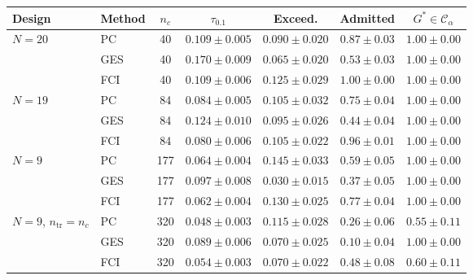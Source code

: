 \begin{tabular}{llccccc}
\toprule
Design & Method & $n_c$ & $\tau_{0.1}$ & Exceed. & Admitted & $G^\ast\in\mathcal{C}_\alpha$ \\
\midrule
$N{=}20$ & PC & 40 & $0.109\pm0.005$ & $0.090\pm0.020$ & $0.87\pm0.03$ & $1.00\pm0.00$ \\
 & GES & 40 & $0.170\pm0.009$ & $0.065\pm0.020$ & $0.53\pm0.03$ & $1.00\pm0.00$ \\
 & FCI & 40 & $0.109\pm0.006$ & $0.125\pm0.029$ & $1.00\pm0.00$ & $1.00\pm0.00$ \\
\addlinespace
$N{=}19$ & PC & 84 & $0.084\pm0.005$ & $0.105\pm0.032$ & $0.75\pm0.04$ & $1.00\pm0.00$ \\
 & GES & 84 & $0.124\pm0.010$ & $0.095\pm0.026$ & $0.44\pm0.04$ & $1.00\pm0.00$ \\
 & FCI & 84 & $0.080\pm0.006$ & $0.105\pm0.022$ & $0.96\pm0.01$ & $1.00\pm0.00$ \\
\addlinespace
$N{=}9$ & PC & 177 & $0.064\pm0.004$ & $0.145\pm0.033$ & $0.59\pm0.05$ & $1.00\pm0.00$ \\
 & GES & 177 & $0.097\pm0.008$ & $0.030\pm0.015$ & $0.37\pm0.05$ & $1.00\pm0.00$ \\
 & FCI & 177 & $0.062\pm0.004$ & $0.130\pm0.025$ & $0.77\pm0.04$ & $1.00\pm0.00$ \\
\addlinespace
$N{=}9$, $n_{\mathrm{tr}}{=}n_c$ & PC & 320 & $0.048\pm0.003$ & $0.115\pm0.028$ & $0.26\pm0.06$ & $0.55\pm0.11$ \\
 & GES & 320 & $0.089\pm0.006$ & $0.070\pm0.025$ & $0.10\pm0.04$ & $1.00\pm0.00$ \\
 & FCI & 320 & $0.054\pm0.003$ & $0.070\pm0.022$ & $0.48\pm0.08$ & $0.60\pm0.11$ \\
\bottomrule
\end{tabular}
